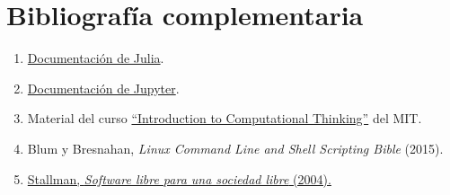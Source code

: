 \documentclass[a4paper]{article}
\begin{document}
\section*{Bibliografía complementaria} \label{Sec: Bibliografía complementaria}

\begin{enumerate}

    \item \href{https://docs.julialang.org/en/v1/}{Documentación de Julia}.

    \item \href{https://docs.jupyter.org/en/latest/}{Documentación de Jupyter}.

    \item Material del curso \href{https://computationalthinking.mit.edu/Spring21/}{``Introduction to Computational Thinking''} del MIT.

    \item Blum y Bresnahan, \emph{Linux Command Line and Shell Scripting Bible} (2015).

    \item \href{https://www.gnu.org/philosophy/fsfs/free_software.es.pdf}{Stallman, \emph{Software libre para una sociedad libre} (2004).}
\end{enumerate}
\end{document}
